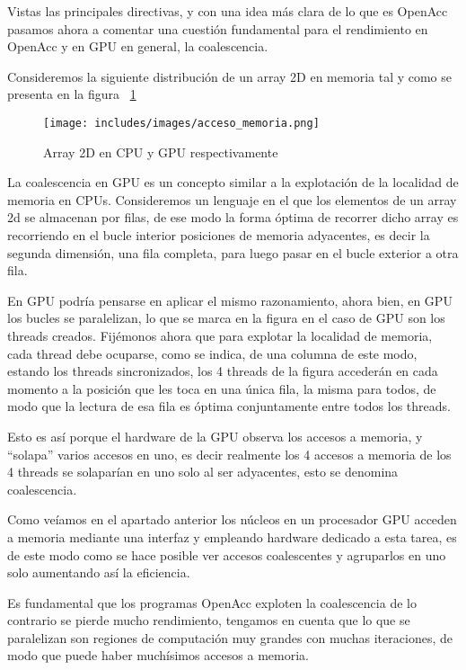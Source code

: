 Vistas las principales directivas, y con una idea más clara de lo que es OpenAcc pasamos ahora a comentar una cuestión fundamental para el rendimiento en OpenAcc y en GPU en general, la coalescencia.

Consideremos la siguiente distribución de un array 2D en memoria tal y como se presenta en la figura ~\ref{fig:Array2D}

\begin{figure}[tph]
\centering
\texttt{[image: includes/images/acceso\_memoria.png]}
\caption{Array 2D en CPU y GPU respectivamente}
\label{fig:Array2D}
\end{figure}

La coalescencia en GPU es un concepto similar a la explotación de la localidad de memoria en CPUs. Consideremos un lenguaje en el que los elementos de un array 2d se almacenan por filas, de ese modo la forma óptima de recorrer dicho array es recorriendo en el bucle interior posiciones de memoria adyacentes, es decir la segunda dimensión, una fila completa, para luego pasar en el bucle exterior a otra fila.

En GPU podría pensarse en aplicar el mismo razonamiento, ahora bien, en GPU los bucles se paralelizan, lo que se marca en la figura en el caso de GPU son los threads creados. Fijémonos ahora que para explotar la localidad de memoria, cada thread debe ocuparse, como se indica, de una columna de este modo, estando los threads sincronizados, los 4 threads de la figura accederán en cada momento a la posición que les toca en una única fila, la misma para todos, de modo que la lectura de esa fila es óptima conjuntamente entre todos los threads.

Esto es así porque el hardware de la GPU observa los accesos a memoria, y “solapa” varios accesos en uno, es decir realmente los 4 accesos a memoria de los 4 threads se solaparían en uno solo al ser adyacentes, esto se denomina coalescencia.

Como veíamos en el apartado anterior los núcleos en un procesador GPU acceden a memoria mediante una interfaz y empleando hardware dedicado a esta tarea, es de este modo como se hace posible ver accesos coalescentes y agruparlos en uno solo aumentando así la eficiencia.

Es fundamental que los programas OpenAcc exploten la coalescencia de lo contrario se pierde mucho rendimiento, tengamos en cuenta que lo que se paralelizan son regiones de computación muy grandes con muchas iteraciones, de modo que puede haber muchísimos accesos a memoria.


